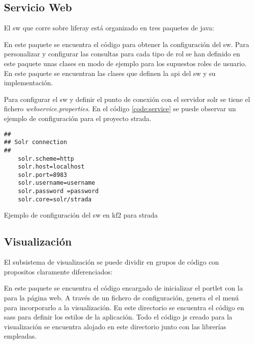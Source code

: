 \subsection{Servicio Web}
El \gls{sw} que corre sobre \gls{liferay} está organizado en tres paquetes de \gls{java}:
\begin{itemize}
    En este paquete se encuentra el código para obtener la configuración del \gls{sw}.
    Para personalizar y configurar las consultas para cada tipo de rol se han definido en este paquete unas clases en modo de ejemplo para los supuestos roles de usuario.
    En este paquete se encuentran las clases que definen la \gls{api} del \gls{sw} y su implementación.
\end{itemize}

Para configurar el \gls{sw} y definir el punto de conexión con el servidor \gls{solr} se tiene el fichero \textit{webservice.properties}. En el código \ref{code:service} se puede observar un ejemplo de configuración para el proyecto \gls{strada}.

\begin{listing}[H]
\begin{verbatim}
##
## Solr connection
##
	solr.scheme=http
	solr.host=localhost
	solr.port=8983
	solr.username=username
	solr.password =password
	solr.core=solr/strada

    \end{verbatim}
	\caption{Ejemplo de configuración del \gls{sw} en \gls{kf2} para \gls{strada}}
	\label{code:service}
\end{listing}

\subsection{Visualización}
El subsistema de visualización se puede dividir en grupos de código con propositos claramente diferenciados:

\begin{itemize}
    En este paquete se encuentra el código encargado de inicializar el \gls{portlet} con la para la página web.
    A través de un fichero de configuración, genera el el menú para incorporarlo a la visualización.
    En este directorio se encuentra el código en \gls{sass} para definir los estilos de la aplicación.
    Todo el código \gls{js} creado para la visualización se encuentra alojado en este directorio junto con las librerías empleadas.
\end{itemize}


